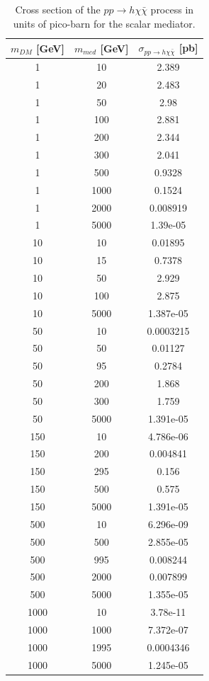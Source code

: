 \begin{table}
	\centering
	\begin{tabular}{ccc}
		$m_{DM}$ [GeV] & $m_{med}$ [GeV] & $\sigma_{pp\rightarrow h\chi\bar{\chi}}$ [pb] \\ \hline
		1 & 10 & 2.389 \\
		1 & 20 & 2.483 \\
		1 & 50 & 2.98 \\
		1 & 100 & 2.881 \\
		1 & 200 & 2.344 \\
		1 & 300 & 2.041 \\
		1 & 500 & 0.9328 \\
		1 & 1000 & 0.1524 \\
		1 & 2000 & 0.008919 \\
		1 & 5000 & 1.39e-05 \\ \hline
		10 & 10 & 0.01895 \\
		10 & 15 & 0.7378 \\
		10 & 50 & 2.929 \\
		10 & 100 & 2.875 \\
		10 & 5000 & 1.387e-05 \\ \hline
		50 & 10 & 0.0003215 \\
		50 & 50 & 0.01127 \\
		50 & 95 & 0.2784 \\
		50 & 200 & 1.868 \\
		50 & 300 & 1.759 \\
		50 & 5000 & 1.391e-05 \\ \hline
		150 & 10 & 4.786e-06 \\
		150 & 200 & 0.004841 \\
		150 & 295 & 0.156 \\
		150 & 500 & 0.575 \\
		150 & 5000 & 1.391e-05 \\ \hline
		500 & 10 & 6.296e-09 \\
		500 & 500 & 2.855e-05 \\
		500 & 995 & 0.008244 \\
		500 & 2000 & 0.007899 \\
		500 & 5000 & 1.355e-05 \\ \hline
		1000 & 10 & 3.78e-11 \\
		1000 & 1000 & 7.372e-07 \\
		1000 & 1995 & 0.0004346 \\
		1000 & 5000 & 1.245e-05 \\ \hline
	\end{tabular}
	\caption{ \label{tab:scalarXS} Cross section of the $pp \rightarrow h\chi\bar{\chi}$ process 
		in units of pico-barn for the scalar mediator.}
\end{table}


